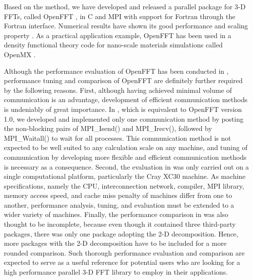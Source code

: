 Based on the method, we have developed and released a parallel package for 3-D FFTs, called OpenFFT \cite{openfft,duytvtisc14}, in C and MPI with support for Fortran through the Fortran interface. 
Numerical results have shown its good performance and scaling property \cite{Duy2014153}. As a practical application example, OpenFFT has been used in a density functional theory code for nano-scale materials simulations called OpenMX \cite{Duy2014777,openmx}.

Although the performance evaluation of OpenFFT has been conducted in \cite{Duy2014153}, performance tuning and comparison of OpenFFT are definitely further required by the following reasons. First, although having achieved minimal volume of communication is an advantage, development of efficient communication methods is undeniably of great importance. In \cite{Duy2014153}, which is equivalent to OpenFFT version 1.0, we developed and implemented only one communication method by posting the non-blocking pairs of MPI\_Isend() and MPI\_Irecv(), followed by MPI\_Waitall() to wait for all processes. This communication method is not expected to be well suited to any calculation scale on any machine, and tuning of communication by developing more flexible and efficient communication methods is necessary as a consequence. Second, the evaluation in \cite{Duy2014153} was only carried out on a single computational platform, particularly the Cray XC30 machine. As machine specifications, namely the CPU, interconnection network, compiler, MPI library, memory access speed, and cache miss penalty of machines differ from one to another, performance analysis, tuning, and evaluation must be extended to a wider variety of machines. Finally, the performance comparison in \cite{Duy2014153} was also thought to be incomplete, because even though it contained three third-party packages, there was only one package adopting the 2-D decomposition. Hence, more packages with the 2-D decomposition have to be included for a more rounded comparison. Such thorough performance evaluation and comparison are expected to serve as a useful reference for potential users who are looking for a high performance parallel 3-D FFT library to employ in their applications. 

